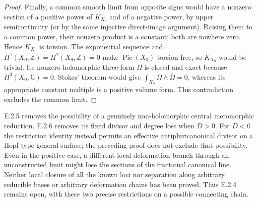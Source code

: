 \begin{proof}
Finally, a common smooth limit from opposite signs would
have a nonzero section of a positive power of $K_{X_0}$
and of a negative power, by upper semicontinuity (or by
the same injective direct-image argument).  Raising them
to a common power, their nonzero product is a constant;
both are nowhere zero.  Hence $K_{X_0}$ is torsion.
The exponential sequence and $H^1(X_0,\mathbb Z)=
H^2(X_0,\mathbb Z)=0$ make $\operatorname{Pic}(X_0)$
torsion-free, so $K_{X_0}$ would be trivial.  Its nonzero
holomorphic three-form $\Omega$ is closed and exact because
$H^3(X_0,\mathbb C)=0$.  Stokes' theorem would give
$\int_{X_0}\Omega\wedge\overline\Omega=0$, whereas its
appropriate constant multiple is a positive volume form.
This contradiction excludes the common limit.
\end{proof}

\begin{remark}
E.2.5 removes the possibility of a genuinely non-holomorphic
central meromorphic reduction.  E.2.6 removes its fixed
divisor and degree loss when $D>0$.  For $D<0$ the restriction
identity instead permits an effective antipluricanonical
divisor on a Hopf-type general surface; the preceding proof
does not exclude that possibility.  Even in the positive
case, a different local deformation branch through an
unconstructed limit might lose the sections of the
fractional canonical line.  Neither local closure of all
the known loci nor separation along arbitrary reducible
bases or arbitrary deformation chains has been proved.
Thus E.2.4 remains open, with these two precise restrictions
on a possible connecting chain.
\end{remark}
